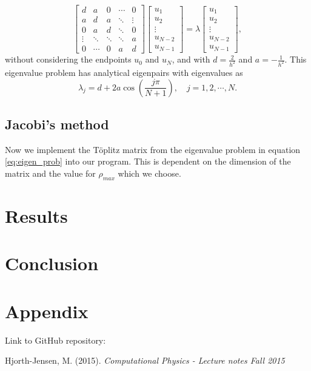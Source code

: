 \documentclass[12pt,a4paper,english]{article}
\begin{document}
\begin{equation}
\label{eq:eigen_prob}
\begin{bmatrix}
d & a & 0 & \cdots & 0\\
a & d & a &\ddots & \vdots\\
0 & a & d & \ddots & 0\\
\vdots & \ddots & \ddots & \ddots & a\\
0 & \cdots & 0 & a & d
\end{bmatrix}
\begin{bmatrix}
u_1\\
u_2\\
\vdots\\
u_{N-2}\\
u_{N-1}
\end{bmatrix} = \lambda
\begin{bmatrix}
u_1\\
u_2\\
\vdots\\
u_{N-2}\\
u_{N-1}
\end{bmatrix},
\end{equation}
without considering the endpoints $u_0$ and $u_N$, and with $d=\frac{2}{h^2}$ and $a=-\frac{1}{h^2}$. This eigenvalue problem has analytical eigenpairs with eigenvalues as
\begin{equation}
\label{eq:analytic_eigenval}
\lambda_j = d+2a\cos(\frac{j\pi}{N+1}),\quad j=1,2,\cdots,N.
\end{equation}

\subsection{Jacobi's method}
\label{sect:Jacobi}
Now we implement the Töplitz matrix from the eigenvalue problem in equation \ref{eq:eigen_prob} into our program. This is dependent on the dimension of the matrix and the value for $\rho_{max}$ which we choose. 


\section{Results}
\section{Conclusion}
\section{Appendix}
Link to GitHub repository:

\begin{thebibliography}{}
Hjorth-Jensen, M. (2015). \textit{Computational Physics - Lecture notes Fall 2015}
\end{thebibliography}
\end{document}
